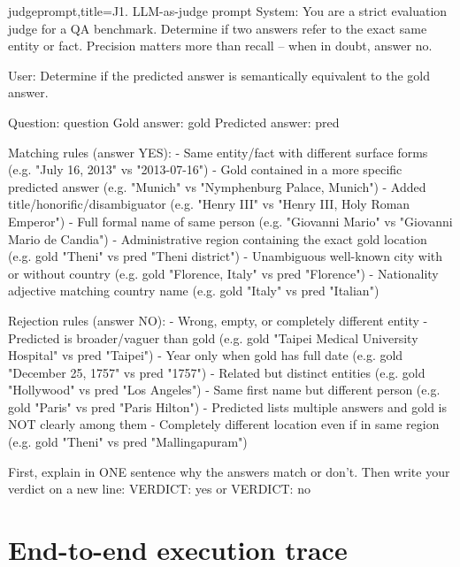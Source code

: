 \documentclass[11pt]{article}
\begin{document}
\begin{tcblisting}{judgeprompt,title={J1. LLM-as-judge prompt}}
System:
You are a strict evaluation judge for a QA benchmark. Determine if two answers refer to the exact same entity or fact. Precision matters more than recall -- when in doubt, answer no.

User:
Determine if the predicted answer is semantically equivalent to the gold answer.

Question: {question}
Gold answer: {gold}
Predicted answer: {pred}

Matching rules (answer YES):
- Same entity/fact with different surface forms (e.g. "July 16, 2013" vs "2013-07-16")
- Gold contained in a more specific predicted answer (e.g. "Munich" vs "Nymphenburg Palace, Munich")
- Added title/honorific/disambiguator (e.g. "Henry III" vs "Henry III, Holy Roman Emperor")
- Full formal name of same person (e.g. "Giovanni Mario" vs "Giovanni Mario de Candia")
- Administrative region containing the exact gold location (e.g. gold "Theni" vs pred "Theni district")
- Unambiguous well-known city with or without country (e.g. gold "Florence, Italy" vs pred "Florence")
- Nationality adjective matching country name (e.g. gold "Italy" vs pred "Italian")

Rejection rules (answer NO):
- Wrong, empty, or completely different entity
- Predicted is broader/vaguer than gold (e.g. gold "Taipei Medical University Hospital" vs pred "Taipei")
- Year only when gold has full date (e.g. gold "December 25, 1757" vs pred "1757")
- Related but distinct entities (e.g. gold "Hollywood" vs pred "Los Angeles")
- Same first name but different person (e.g. gold "Paris" vs pred "Paris Hilton")
- Predicted lists multiple answers and gold is NOT clearly among them
- Completely different location even if in same region (e.g. gold "Theni" vs pred "Mallingapuram")

First, explain in ONE sentence why the answers match or don't.
Then write your verdict on a new line: VERDICT: yes or VERDICT: no
\end{tcblisting}

\clearpage



\section{End-to-end execution trace}
\label{sec:end-to-end-trace}
\end{document}
